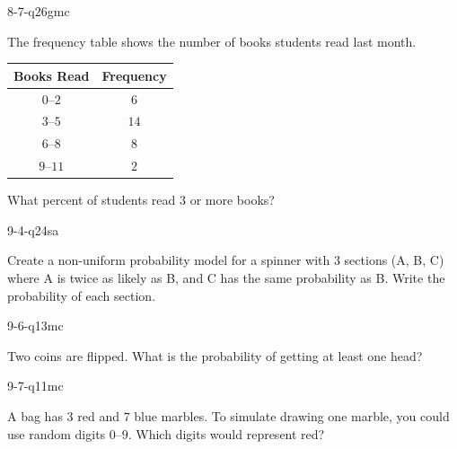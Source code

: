 \begin{practiceQuestion}{8-7-q26}{gmc}
\begin{questionText}
The frequency table shows the number of books students read last month.

\begin{center}
\begin{tabular}{|c|c|}
\hline
\textbf{Books Read} & \textbf{Frequency} \\
\hline
$0$--$2$ & $6$ \\
\hline
$3$--$5$ & $14$ \\
\hline
$6$--$8$ & $8$ \\
\hline
$9$--$11$ & $2$ \\
\hline
\end{tabular}
\end{center}

What percent of students read $3$ or more books?
\end{questionText}
\end{practiceQuestion}

\begin{practiceQuestion}{9-4-q24}{sa}
\begin{questionText}
Create a non-uniform probability model for a spinner with $3$ sections (A, B, C) where A is twice as likely as B, and C has the same probability as B. Write the probability of each section.
\end{questionText}
\end{practiceQuestion}

\begin{practiceQuestion}{9-6-q13}{mc}
\begin{questionText}
Two coins are flipped. What is the probability of getting at least one head?
\end{questionText}
\end{practiceQuestion}

\begin{practiceQuestion}{9-7-q11}{mc}
\begin{questionText}
A bag has $3$ red and $7$ blue marbles. To simulate drawing one marble, you could use random digits $0$--$9$. Which digits would represent red?
\end{questionText}
\end{practiceQuestion}
